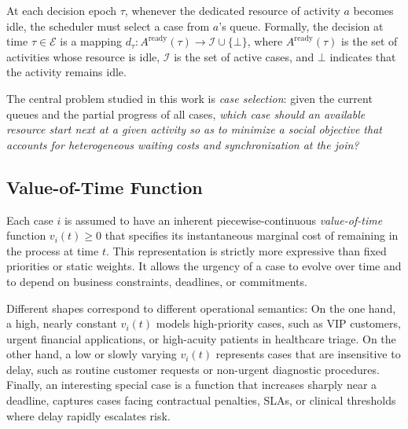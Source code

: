 \documentclass[letterpaper]{article}
\begin{document}
At each decision epoch $\tau$, whenever the dedicated resource of
activity $a$ becomes idle, the scheduler must select a case from $a$'s
queue.  Formally, the decision at time $\tau\in\mathcal{E}$ is a mapping
$d_\tau : A^{\mathrm{ready}}(\tau) \to \mathcal{I} \cup \{\bot\}$,
where $A^{\mathrm{ready}}(\tau)$ is the set of activities whose
resource is idle, $\mathcal{I}$ is the set of active cases,
and $\bot$ indicates that the activity remains idle.


The central problem studied in this work is \emph{case selection}: given the current queues and the partial progress of all cases, \emph{which case should an available resource start next at a given activity so as to minimize a social objective that accounts for heterogeneous waiting costs and synchronization at the join?}


\subsection{Value-of-Time Function}

Each case $i$ is assumed to have an inherent piecewise-continuous \emph{value-of-time} function
$v_i(t)\ge 0$ that specifies its instantaneous marginal cost of
remaining in the process at time $t$. This representation is strictly
more expressive than fixed priorities or static weights. It allows the
urgency of a case to evolve over time and to depend on business
constraints, deadlines, or commitments.

Different shapes correspond to different operational semantics:
 On the one hand, a high, nearly constant $v_i(t)$ models high-priority
  cases, such as VIP customers, urgent financial applications, or
  high-acuity patients in healthcare triage.
  On the other hand, a low or slowly varying $v_i(t)$ represents cases that are
 insensitive to delay, such as routine customer requests or
  non-urgent diagnostic procedures.
 Finally, an interesting special case is a function that increases sharply near a deadline, captures cases facing contractual penalties, SLAs, or clinical thresholds where
  delay rapidly escalates risk.
\end{document}
